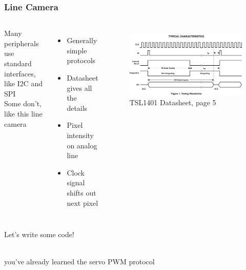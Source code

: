 \documentclass{beamer}
\begin{document}
\begin{frame}
\frametitle{Line Camera}
\begin{columns}[t]
  Many peripherals use standard interfaces, like I2C and SPI \\
  \hfill \break
  Some don't, like this line camera
  \begin{itemize}
    \item Generally simple protocols
    \item Datasheet gives all the details
    \item Pixel intensity on analog line
    \item Clock signal shifts out next pixel
  \end{itemize}
  \begin{figure}
    \centering
    \includegraphics[width = 0.9\columnwidth]{external/tsl1401-p5-waveforms} \\
    TSL1401 Datasheet, page 5
  \end{figure}
\end{columns}
\end{frame}

\begin{frame}
\centering \huge Let's write some code!
\end{frame}

\begin{frame}
 \\
\hfill \break
you've already learned the servo PWM protocol
\end{frame}
\end{document}
